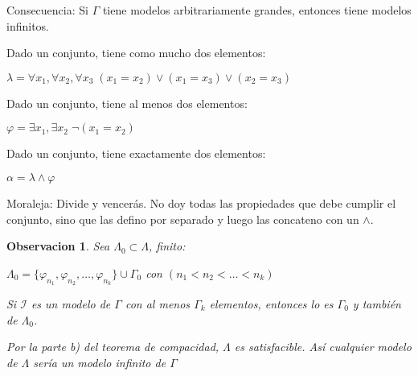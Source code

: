 \documentclass{amsart}
\newtheorem*{observacion}{Observacion}
\begin{document}
Consecuencia: Si $\Gamma$ tiene modelos arbitrariamente grandes, entonces tiene modelos infinitos.

\begin{ejercicio}
Dado un conjunto, tiene como mucho dos elementos:

$\lambda = \forall x_1, \forall x_2, \forall x_3 \; (x_1 = x_2) \lor (x_1 = x_3) \lor (x_2 = x_3)$
\end{ejercicio}

\begin{ejercicio}
Dado un conjunto, tiene al menos dos elementos:

$\varphi = \exists x_1, \exists x_2 \; \neg (x_1 = x_2)$
\end{ejercicio}

\begin{ejercicio}
Dado un conjunto, tiene exactamente dos elementos:

$\alpha = \lambda \land \varphi$

Moraleja: Divide y vencer\'as. No doy todas las propiedades que debe cumplir el conjunto, sino que las defino por separado y luego las concateno con un $\land$.
\end{ejercicio}

\begin{observacion}
Sea $\varLambda_0 \subset \varLambda$, finito:

$\varLambda_0 = \{ \varphi_{n_1}, \varphi_{n_2}, \ldots, \varphi_{n_k} \} \cup \Gamma_0$ con $(n_1 < n_2 < \ldots < n_k)$

Si $\mathcal{I}$ es un modelo de $\Gamma$ con al menos $\Gamma_k$ elementos, entonces lo es $\Gamma_0$ y tambi\'en de $\varLambda_0$.

Por la parte b) del teorema de compacidad, $\varLambda$ es satisfacible. As\'i cualquier modelo de $\varLambda$ ser\'ia un modelo infinito de $\Gamma$
\end{observacion}
\end{document}
